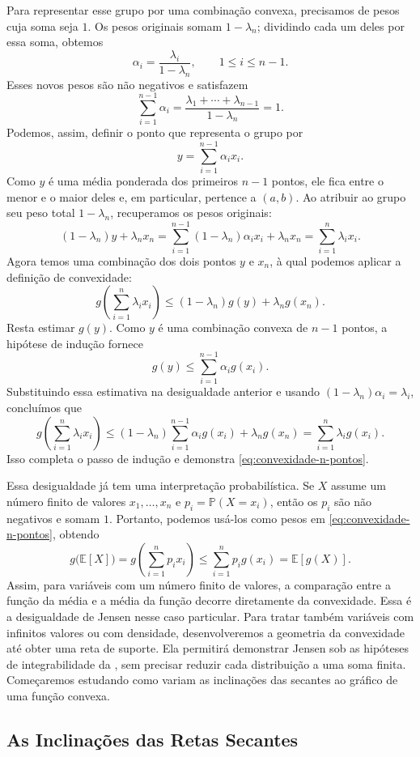 \documentclass[12pt,portuguese]{article}
\theoremstyle{definition}
\theoremstyle{plainexercise}
\theoremstyle{starredexercise}
\theoremstyle{definition}
\begin{document}
Para representar esse grupo por uma combinação convexa, precisamos de
pesos cuja soma seja $1$. Os pesos originais somam $1-\lambda_n$;
dividindo cada um deles por essa soma, obtemos
\[
\alpha_i=\frac{\lambda_i}{1-\lambda_n},\qquad 1\leqslant i\leqslant n-1.
\]
Esses novos pesos são não negativos e satisfazem
\[
\sum_{i=1}^{n-1}\alpha_i
=\frac{\lambda_1+\cdots+\lambda_{n-1}}{1-\lambda_n}=1.
\]
Podemos, assim, definir o ponto que representa o grupo por
\[
y=\sum_{i=1}^{n-1}\alpha_ix_i.
\]
Como $y$ é uma média ponderada dos primeiros $n-1$ pontos, ele fica entre
o menor e o maior deles e, em particular, pertence a $(a,b)$. Ao atribuir
ao grupo seu peso total $1-\lambda_n$, recuperamos os pesos originais:
\[
(1-\lambda_n)y+\lambda_nx_n
=\sum_{i=1}^{n-1}(1-\lambda_n)\alpha_ix_i+\lambda_nx_n
=\sum_{i=1}^n\lambda_ix_i.
\]
Agora temos uma combinação dos dois pontos $y$ e $x_n$, à qual podemos
aplicar a definição de convexidade:
\[
g\left(\sum_{i=1}^n\lambda_ix_i\right)
\leqslant(1-\lambda_n)g(y)+\lambda_ng(x_n).
\]
Resta estimar $g(y)$. Como $y$ é uma combinação convexa de $n-1$ pontos,
a hipótese de indução fornece
\[
g(y)\leqslant\sum_{i=1}^{n-1}\alpha_i g(x_i).
\]
Substituindo essa estimativa na desigualdade anterior e usando
$(1-\lambda_n)\alpha_i=\lambda_i$, concluímos que
\[
g\left(\sum_{i=1}^n\lambda_ix_i\right)
\leqslant(1-\lambda_n)\sum_{i=1}^{n-1}\alpha_i g(x_i)+\lambda_ng(x_n)
=\sum_{i=1}^n\lambda_i g(x_i).
\]
Isso completa o passo de indução e demonstra
\eqref{eq:convexidade-n-pontos}.

Essa desigualdade já tem uma interpretação probabilística. Se $X$ assume
um número finito de valores $x_1,\ldots,x_n$ e
$p_i=\mathbb{P}(X=x_i)$, então os $p_i$ são não negativos e somam $1$.
Portanto, podemos usá-los como pesos em
\eqref{eq:convexidade-n-pontos}, obtendo
\[
g\bigl(\mathbb{E}[X]\bigr)
=g\left(\sum_{i=1}^n p_ix_i\right)
\leqslant\sum_{i=1}^n p_i g(x_i)
=\mathbb{E}[g(X)].
\]
Assim, para variáveis com um número finito de valores, a comparação entre
a função da média e a média da função decorre diretamente da convexidade.
Essa é a desigualdade de Jensen nesse caso particular. Para tratar também
variáveis com infinitos valores ou com densidade, desenvolveremos a
geometria da convexidade até obter uma reta de suporte. Ela permitirá
demonstrar Jensen sob as hipóteses de integrabilidade da
, sem precisar reduzir cada distribuição a uma soma
finita. Começaremos estudando como variam as inclinações das secantes ao
gráfico de uma função convexa.

\subsection{As Inclinações das Retas Secantes}\label{subsec:secantes}
\end{document}
